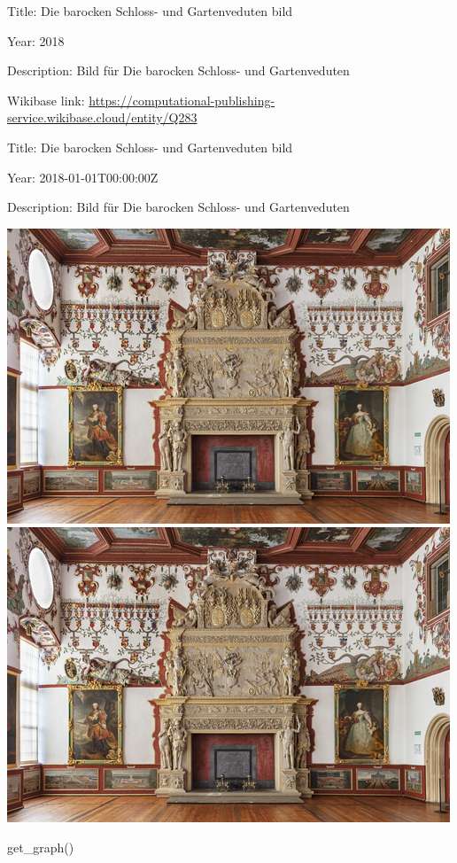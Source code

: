 \documentclass[
  a4paper,
]{book}
\newenvironment{Shaded}{\begin{snugshade}}{\end{snugshade}}
\newcommand{\NormalTok}[1]{\textcolor[rgb]{0.00,0.23,0.31}{#1}}
\begin{document}
Title: Die barocken Schloss- und Gartenveduten bild

Year: 2018

Description: Bild für Die barocken Schloss- und Gartenveduten

Wikibase link:
\url{https://computational-publishing-service.wikibase.cloud/entity/Q283}

Title: Die barocken Schloss- und Gartenveduten bild

Year: 2018-01-01T00:00:00Z

Description: Bild für Die barocken Schloss- und Gartenveduten

\includegraphics{section_files/figure-pdf/cell-4-output-2.png}
\includegraphics{section_files/figure-pdf/cell-4-output-3.png}

\begin{Shaded}
\begin{Highlighting}[]
\NormalTok{get\_graph()}
\end{Highlighting}
\end{Shaded}
\end{document}

